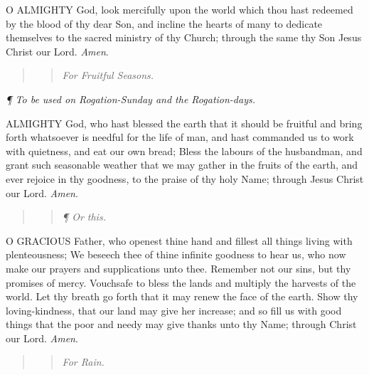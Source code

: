 O
ALMIGHTY God, look mercifully upon the world which thou hast redeemed
by the blood of thy dear Son, and incline the hearts of many to dedicate
themselves to the sacred ministry of thy Church; through the same thy
Son Jesus Christ our Lord. \emph{Amen}.

\begin{quote}

\begin{quote}

\emph{For
Fruitful Seasons.}

\end{quote}

\end{quote}

\emph{¶
To be used on Rogation-Sunday and the Rogation-days.}

ALMIGHTY
God, who hast blessed the earth that it should be fruitful and bring forth
whatsoever is needful for the life of man, and hast commanded us to work
with quietness, and eat our own bread; Bless the labours of the husbandman,
and grant such seasonable weather that we may gather in the fruits of
the earth, and ever rejoice in thy goodness, to the praise of thy holy
Name; through Jesus Christ our Lord. \emph{Amen}.

\begin{quote}

\begin{quote}

\emph{¶
Or this.}

\end{quote}

\end{quote}

O
GRACIOUS Father, who openest thine hand and fillest all things living
with plenteousness; We beseech thee of thine infinite goodness to hear
us, who now make our prayers and supplications unto thee. Remember not
our sins, but thy promises of mercy. Vouchsafe to bless the lands and
multiply the harvests of the world. Let thy breath go forth that it may
renew the face of the earth. Show thy loving-kindness, that our land may
give her increase; and so fill us with good things that the poor and needy
may give thanks unto thy Name; through Christ our Lord. \emph{Amen}.

\begin{quote}

\begin{quote}

\emph{For
Rain.}

\end{quote}

\end{quote}

